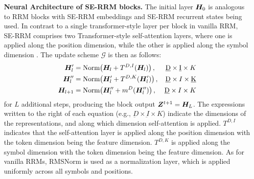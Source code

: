\documentclass{article}
\theoremstyle{plain}
\theoremstyle{definition}
\theoremstyle{remark}
\renewcommand{\paragraph}[1]{\textbf{#1}\;}
\begin{document}
\paragraph{Neural Architecture of SE-RRM blocks.} The  initial layer $\bm{H}_0$ is analogous to RRM blocks with SE-RRM embeddings and SE-RRM recurrent states being used. In contrast to a single transformer-style layer per block in vanilla RRM, SE-RRM comprises two Transformer-style self-attention layers, where one is applied along the position dimension, while the other is applied along the symbol dimension
\citep{rao2021msa,tolstikhin2021mlp,ho2019axial,huang2019ccnet}. The update scheme $\mathcal{G}$ is then as follows:
\begin{align} 
    \bm{H}'_{l} &= \text{Norm}\!\left( \bm{H}_{l} + T^{D,I}(\bm{H}_{l}) \right), &  \underbar{D} \times  \underbar{I} \times K \label{eq:serrmb1}\\
    \bm{H}''_{l} &= \text{Norm}\!\left(\bm{H}'_{l} + T^{D,K}(\bm{H}'_{l})\right), &  \underbar{D} \times  I \times \underbar{K} \label{eq:serrmb2}\\
    \bm{H}_{l+1} &= \text{Norm}\!\left(\bm{H}''_{l} + m^{D}(\bm{H}''_{l})\right), & \underbar{D} \times I \times K\label{eq:serrmb3}
\end{align}
for $L$ additional steps, producing the block output $\bm{Z}^{t+1} = \bm{H}_L$. The expressions written to the right of each equation (e.g., $\underbar{D} \times  \underbar{I} \times K$) indicate the dimensions of the 
representations, and along which dimension self-attention is applied. $T^{D,I}$ indicates that the self-attention layer is applied along the position dimension with the token dimension being the feature dimension. $T^{D,K}$ is applied along the symbol dimension with the token dimension being the feature dimension. As for vanilla RRMs, RMSNorm \citep{zhang2019root} is used as a normalization layer, which is applied uniformly across all symbols and positions.
\end{document}
